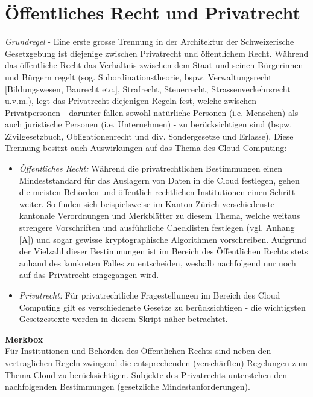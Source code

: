 \documentclass[a4paper,pointlessnumbers]{scrreprt}
\newcommand{\merkbox}[2][0.8\textwidth]{ \begin{center} \begin{tcolorbox}[enhanced, drop fuzzy midday shadow, width={#1}, opacityframe=0.5, colframe=BrickRed, colback=white] {\ECFTeenSpirit \color{BrickRed}\textbf{Merkbox} \qquad {\tiny das gilt es zu beachten}} \\  #2 \end{tcolorbox} \end{center}}
\begin{document}
\section{Öffentliches Recht und Privatrecht}
\textit{Grundregel} - Eine erste grosse Trennung in der \glqq Architektur\grqq{} der Schweizerische Gesetzgebung ist diejenige zwischen Privatrecht und öffentlichem Recht. Während das öffentliche Recht das Verhältnis zwischen dem Staat und seinen Bürgerinnen und Bürgern regelt (sog. Subordinationstheorie, bspw. Verwaltungsrecht [Bildungswesen, Baurecht etc.], Strafrecht, Steuerrecht, Strassenverkehrsrecht u.v.m.), legt das Privatrecht diejenigen Regeln fest, welche zwischen Privatpersonen - darunter fallen sowohl natürliche Personen (i.e. Menschen) als auch juristische Personen (i.e. Unternehmen) - zu berücksichtigen sind (bspw. Zivilgesetzbuch, Obligationenrecht und div. Sondergesetze und Erlasse). Diese Trennung besitzt auch Auswirkungen auf das Thema des Cloud Computing:
\begin{itemize}[itemsep=0pt]
\item \textit{Öffentliches Recht:} Während die privatrechtlichen Bestimmungen einen Mindeststandard für das Auslagern von Daten in die Cloud festlegen, gehen die meisten Behörden und öffentlich-rechtlichen Institutionen einen Schritt weiter. So finden sich beispielsweise im Kanton Zürich verschiedenste kantonale Verordnungen und Merkblätter zu diesem Thema, welche weitaus strengere Vorschriften und ausführliche Checklisten festlegen (vgl. Anhang \ref{A}) und sogar gewisse kryptographische Algorithmen vorschreiben. Aufgrund der Vielzahl dieser Bestimmungen ist im Bereich des Öffentlichen Rechts stets anhand des konkreten Falles zu entscheiden, weshalb nachfolgend nur noch auf das Privatrecht eingegangen wird.
\item \textit{Privatrecht:} Für privatrechtliche Fragestellungen im Bereich des Cloud Computing gilt es verschiedenste Gesetze zu berücksichtigen - die wichtigsten Gesetzestexte werden in diesem Skript näher betrachtet.
\end{itemize}

\merkbox[0.7\textwidth]{Für Institutionen und Behörden des Öffentlichen Rechts sind neben den vertraglichen Regeln zwingend die entsprechenden (verschärften) Regelungen zum Thema Cloud zu berücksichtigen. Subjekte des Privatrechts unterstehen den nachfolgenden Bestimmungen (gesetzliche Mindestanforderungen).}
\end{document}
